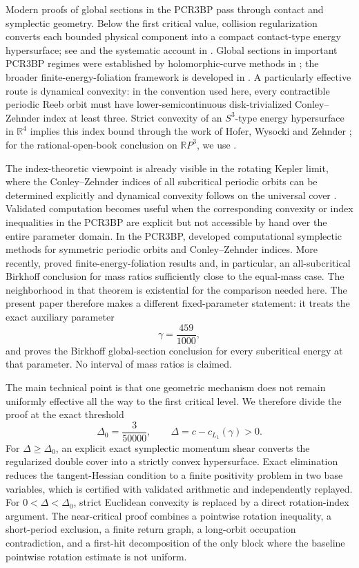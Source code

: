 \documentclass[11pt]{article}
\begin{document}
Modern proofs of global sections in the PCR3BP pass through contact and symplectic geometry. Below the first critical value, collision regularization converts each bounded physical component into a compact contact-type energy hypersurface; see \citet{AlbersEtAlContact2012} and the systematic account in \citet{FrauenfelderVanKoert2018}. Global sections in important PCR3BP regimes were established by holomorphic-curve methods in \citet{AlbersEtAlGSS2012}; the broader finite-energy-foliation framework is developed in \citet{HWZ2003}. A particularly effective route is dynamical convexity: in the convention used here, every contractible periodic Reeb orbit must have lower-semicontinuous disk-trivialized Conley--Zehnder index at least three. Strict convexity of an $S^3$-type energy hypersurface in $\mathbb{R}^4$ implies this index bound through the work of Hofer, Wysocki and Zehnder \citep{HWZ1998}; for the rational-open-book conclusion on $\mathbb{R}P^3$, we use \citet{HryniewiczSalomao2016}.

The index-theoretic viewpoint is already visible in the rotating Kepler limit, where the Conley--Zehnder indices of all subcritical periodic orbits can be determined explicitly and dynamical convexity follows on the universal cover \citep{AlbersEtAlKepler2013}. Validated computation becomes useful when the corresponding convexity or index inequalities in the PCR3BP are explicit but not accessible by hand over the entire parameter domain. In the PCR3BP, \citet{JoungVanKoert2025} developed computational symplectic methods for symmetric periodic orbits and Conley--Zehnder indices. More recently, \citet{LiuSalomao2025} proved finite-energy-foliation results and, in particular, an all-subcritical Birkhoff conclusion for mass ratios sufficiently close to the equal-mass case. The neighborhood in that theorem is existential for the comparison needed here. The present paper therefore makes a different fixed-parameter statement: it treats the exact auxiliary parameter
\[
\gamma=\frac{459}{1000},
\]
and proves the Birkhoff global-section conclusion for every subcritical energy at that parameter. No interval of mass ratios is claimed.

The main technical point is that one geometric mechanism does not remain uniformly effective all the way to the first critical level. We therefore divide the proof at the exact threshold
\[
\Delta_0=\frac{3}{50000},
\qquad
\Delta=c-c_{L_1}(\gamma)>0.
\]
For $\Delta\ge\Delta_0$, an explicit exact symplectic momentum shear converts the regularized double cover into a strictly convex hypersurface. Exact elimination reduces the tangent-Hessian condition to a finite positivity problem in two base variables, which is certified with validated arithmetic and independently replayed. For $0<\Delta<\Delta_0$, strict Euclidean convexity is replaced by a direct rotation-index argument. The near-critical proof combines a pointwise rotation inequality, a short-period exclusion, a finite return graph, a long-orbit occupation contradiction, and a first-hit decomposition of the only block where the baseline pointwise rotation estimate is not uniform.
\end{document}
